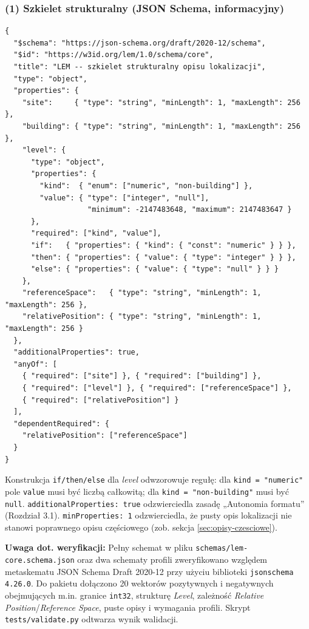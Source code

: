 \subsubsection*{(1) Szkielet strukturalny (JSON Schema, informacyjny)}

\begin{verbatim}
{
  "$schema": "https://json-schema.org/draft/2020-12/schema",
  "$id": "https://w3id.org/lem/1.0/schema/core",
  "title": "LEM -- szkielet strukturalny opisu lokalizacji",
  "type": "object",
  "properties": {
    "site":     { "type": "string", "minLength": 1, "maxLength": 256 },
    "building": { "type": "string", "minLength": 1, "maxLength": 256 },
    "level": {
      "type": "object",
      "properties": {
        "kind":  { "enum": ["numeric", "non-building"] },
        "value": { "type": ["integer", "null"],
                   "minimum": -2147483648, "maximum": 2147483647 }
      },
      "required": ["kind", "value"],
      "if":   { "properties": { "kind": { "const": "numeric" } } },
      "then": { "properties": { "value": { "type": "integer" } } },
      "else": { "properties": { "value": { "type": "null" } } }
    },
    "referenceSpace":   { "type": "string", "minLength": 1, "maxLength": 256 },
    "relativePosition": { "type": "string", "minLength": 1, "maxLength": 256 }
  },
  "additionalProperties": true,
  "anyOf": [
    { "required": ["site"] }, { "required": ["building"] },
    { "required": ["level"] }, { "required": ["referenceSpace"] },
    { "required": ["relativePosition"] }
  ],
  "dependentRequired": {
    "relativePosition": ["referenceSpace"]
  }
}
\end{verbatim}

Konstrukcja \texttt{if/then/else} dla \textit{level} odwzorowuje regułę: dla \texttt{kind = "numeric"} pole \texttt{value} musi być liczbą całkowitą; dla \texttt{kind = "non-building"} musi być \texttt{null}.
\texttt{additionalProperties: true} odzwierciedla zasadę „Autonomia formatu” (Rozdział 3.1). \texttt{minProperties: 1} odzwierciedla, że pusty opis lokalizacji nie stanowi poprawnego opisu częściowego (zob. sekcja \ref{sec:opisy-czesciowe}).

\textbf{Uwaga dot. weryfikacji:} Pełny schemat w pliku \texttt{schemas/lem-core.schema.json} oraz dwa schematy profili zweryfikowano względem metaskematu JSON Schema Draft 2020-12 przy użyciu biblioteki \texttt{jsonschema 4.26.0}. Do pakietu dołączono 20 wektorów pozytywnych i negatywnych obejmujących m.in. granice \texttt{int32}, strukturę \textit{Level}, zależność \textit{Relative Position}/\textit{Reference Space}, puste opisy i wymagania profili. Skrypt \texttt{tests/validate.py} odtwarza wynik walidacji.

